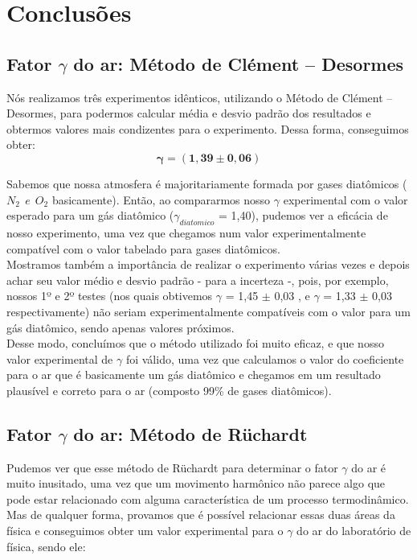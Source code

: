 \newpage
\section{Conclusões}


\subsection{Fator $\gamma$ do ar: Método de Clément – Desormes}

Nós realizamos três experimentos idênticos, utilizando o Método de Clément – Desormes, para podermos calcular média e desvio padrão dos resultados e obtermos valores mais condizentes para o experimento. Dessa forma, conseguimos obter:
\[ \mathbf{\gamma = (1,39 \pm 0,06)} \]

Sabemos que nossa atmosfera é majoritariamente formada por gases diatômicos ($N_2 \ \ e \ \ O_2$ basicamente). Então, ao compararmos nosso $\gamma$ experimental com o valor esperado para um gás diatômico ($\gamma_{diatomico}$ = 1,40), pudemos ver a eficácia de nosso experimento, uma vez que chegamos num valor experimentalmente compatível com o valor tabelado para gases diatômicos.\\

Mostramos também a importância de realizar o experimento várias vezes e depois achar seu valor médio e desvio padrão - para a incerteza -, pois, por exemplo, nossos 1º e 2º testes (nos quais obtivemos $\gamma$ = 1,45 $\pm$ 0,03 , e $\gamma$ = 1,33 $\pm$ 0,03 respectivamente) não seriam experimentalmente compatíveis com o valor para um gás diatômico, sendo apenas valores próximos. \\

Desse modo, concluímos que o método utilizado foi muito eficaz, e que nosso valor experimental de $\gamma$ foi válido, uma vez que calculamos o valor do coeficiente para o ar que é basicamente um gás diatômico e chegamos em um resultado plausível e correto para o ar (composto 99\% de gases diatômicos).


\subsection{Fator $\gamma$ do ar: Método de Rüchardt}

Pudemos ver que esse método de Rüchardt para determinar o fator $\gamma$ do ar é muito inusitado, uma vez que um movimento harmônico não parece algo que pode estar relacionado com alguma característica de um processo termodinâmico. Mas de qualquer forma, provamos que é possível relacionar essas duas áreas da física e conseguimos obter um valor experimental para o $\gamma$ do ar do laboratório de física, sendo ele:

